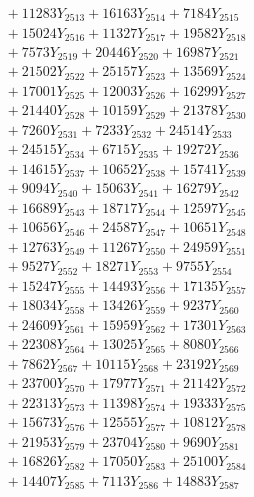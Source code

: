 \documentclass[a4paper,10pt]{article}
\begin{document}
{\begin{align}
&\;  + 11283 Y_{2513} + 16163 Y_{2514} + 7184 Y_{2515} \\[0.3ex]
&\;  + 15024 Y_{2516} + 11327 Y_{2517} + 19582 Y_{2518} \\[0.5ex]\allowbreak
&\;  + 7573 Y_{2519} + 20446 Y_{2520} + 16987 Y_{2521} \\[0.3ex]
&\;  + 21502 Y_{2522} + 25157 Y_{2523} + 13569 Y_{2524} \\[0.3ex]
&\;  + 17001 Y_{2525} + 12003 Y_{2526} + 16299 Y_{2527} \\[0.3ex]
&\;  + 21440 Y_{2528} + 10159 Y_{2529} + 21378 Y_{2530} \\[0.3ex]
&\;  + 7260 Y_{2531} + 7233 Y_{2532} + 24514 Y_{2533} \\[0.3ex]
&\;  + 24515 Y_{2534} + 6715 Y_{2535} + 19272 Y_{2536} \\[0.3ex]
&\;  + 14615 Y_{2537} + 10652 Y_{2538} + 15741 Y_{2539} \\[0.3ex]
&\;  + 9094 Y_{2540} + 15063 Y_{2541} + 16279 Y_{2542} \\[0.3ex]
&\;  + 16689 Y_{2543} + 18717 Y_{2544} + 12597 Y_{2545} \\[0.3ex]
&\;  + 10656 Y_{2546} + 24587 Y_{2547} + 10651 Y_{2548} \\[0.5ex]\allowbreak
&\;  + 12763 Y_{2549} + 11267 Y_{2550} + 24959 Y_{2551} \\[0.3ex]
&\;  + 9527 Y_{2552} + 18271 Y_{2553} + 9755 Y_{2554} \\[0.3ex]
&\;  + 15247 Y_{2555} + 14493 Y_{2556} + 17135 Y_{2557} \\[0.3ex]
&\;  + 18034 Y_{2558} + 13426 Y_{2559} + 9237 Y_{2560} \\[0.3ex]
&\;  + 24609 Y_{2561} + 15959 Y_{2562} + 17301 Y_{2563} \\[0.3ex]
&\;  + 22308 Y_{2564} + 13025 Y_{2565} + 8080 Y_{2566} \\[0.3ex]
&\;  + 7862 Y_{2567} + 10115 Y_{2568} + 23192 Y_{2569} \\[0.3ex]
&\;  + 23700 Y_{2570} + 17977 Y_{2571} + 21142 Y_{2572} \\[0.3ex]
&\;  + 22313 Y_{2573} + 11398 Y_{2574} + 19333 Y_{2575} \\[0.3ex]
&\;  + 15673 Y_{2576} + 12555 Y_{2577} + 10812 Y_{2578} \\[0.5ex]\allowbreak
&\;  + 21953 Y_{2579} + 23704 Y_{2580} + 9690 Y_{2581} \\[0.3ex]
&\;  + 16826 Y_{2582} + 17050 Y_{2583} + 25100 Y_{2584} \\[0.3ex]
&\;  + 14407 Y_{2585} + 7113 Y_{2586} + 14883 Y_{2587} \\[0.3ex]

\end{align}}
\end{document}
